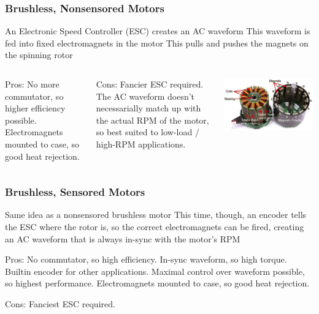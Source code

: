 \documentclass{beamer}%
\begin{document}
\begin{frame}
	\frametitle{Brushless, Nonsensored Motors}
	
	\begin{outline}
		\1 An Electronic Speed Controller (ESC) creates an AC waveform
		\1 This waveform is fed into fixed electromagnets in the motor
		\1 This pulls and pushes the magnets on the spinning rotor
	\end{outline}
	
	\begin{columns}
	\column{0.56\textwidth}
	\begin{block}{}
	Pros: No more commutator, so higher efficiency possible. Electromagnets mounted to case, so good heat rejection.
	\end{block}
	
	\begin{block}{}
	Cons: Fancier ESC required. The AC waveform doesn't necessarially match up with the actual RPM of the motor, so best suited to low-load / high-RPM applications.
	\end{block}
	\column{0.4\textwidth}
	\includegraphics[width=\textwidth]{img_Mechatronics_Motors_brushless.png}
	\end{columns}
\end{frame}

\begin{frame}
	\frametitle{Brushless, Sensored Motors}
	
	\begin{outline}
		\1 Same idea as a nonsensored brushless motor
		\1 This time, though, an encoder tells the ESC where the rotor is, so the correct electromagnets can be fired, creating an AC waveform that is always in-sync with the motor's RPM
	\end{outline}
	
	\begin{block}{}
	Pros: No commutator, so high efficiency. In-sync waveform, so high torque. Builtin encoder for other applications. Maximal control over waveform possible, so highest performance. Electromagnets mounted to case, so good heat rejection.
	\end{block}
	
	\begin{block}{}
	Cons: Fanciest ESC required.
	\end{block}
\end{frame}
\end{document}
